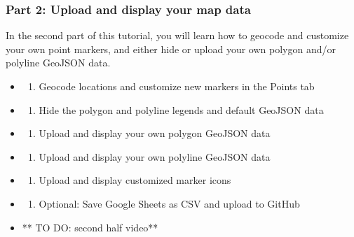 \documentclass[
  english,
]{book}
\providecommand{\tightlist}{%
  \setlength{\itemsep}{0pt}\setlength{\parskip}{0pt}}
\begin{document}
\hypertarget{part-2-upload-and-display-your-map-data}{%
\subsubsection*{Part 2: Upload and display your map data}\label{part-2-upload-and-display-your-map-data}}

In the second part of this tutorial, you will learn how to geocode and customize your own point markers, and either hide or upload your own polygon and/or polyline GeoJSON data.

\begin{itemize}
\item
  \begin{enumerate}
  \def\labelenumi{\Alph{enumi})}
  \setcounter{enumi}{4}
  \tightlist
  \item
    Geocode locations and customize new markers in the Points tab
  \end{enumerate}
\item
  \begin{enumerate}
  \def\labelenumi{\Alph{enumi})}
  \setcounter{enumi}{5}
  \tightlist
  \item
    Hide the polygon and polyline legends and default GeoJSON data
  \end{enumerate}
\item
  \begin{enumerate}
  \def\labelenumi{\Alph{enumi})}
  \setcounter{enumi}{6}
  \tightlist
  \item
    Upload and display your own polygon GeoJSON data
  \end{enumerate}
\item
  \begin{enumerate}
  \def\labelenumi{\Alph{enumi})}
  \setcounter{enumi}{7}
  \tightlist
  \item
    Upload and display your own polyline GeoJSON data
  \end{enumerate}
\item
  \begin{enumerate}
  \def\labelenumi{\Roman{enumi})}
  \tightlist
  \item
    Upload and display customized marker icons
  \end{enumerate}
\item
  \begin{enumerate}
  \def\labelenumi{\Alph{enumi})}
  \setcounter{enumi}{9}
  \tightlist
  \item
    Optional: Save Google Sheets as CSV and upload to GitHub
  \end{enumerate}
\item
  ** TO DO: second half video**
\end{itemize}
\end{document}
